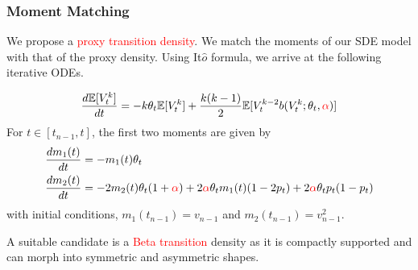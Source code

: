 \documentclass[aspectratio=169]{beamer}\usepackage[utf8]{inputenc}
\newcommand{\E}{\mathbb{E}}
\begin{document}
\begin{frame}\frametitle{Moment Matching}
We propose a \textcolor{red}{proxy transition density}. We match the moments of our SDE model with that of the proxy density. Using It$\hat{o}$ formula, we arrive at the following iterative ODEs.

\begin{equation}
\begin{split}
\frac{d \E[ V^k_t]}{dt} = - k \theta_t \E [ V^k_t] + \frac{k(k-1)}{2} \E [ V^{k-2}_t  b(V^k_t;\theta_t, \textcolor{red}{\alpha})]
\end{split}
\end{equation}
For $t\in [t_{n-1}, t]$, the first two moments are given by
\begin{equation}
\begin{split}
\frac{d m_1 (t)}{dt} &= - m_1(t)\theta_t \\
\frac{d m_2 (t)}{dt} &=  -2 m_2(t)\theta_t(1+\textcolor{red}{\alpha}) + 2\textcolor{red}{\alpha}\theta_t m_1(t)(1-2p_t) + 2 \textcolor{red}{\alpha}\theta_t p_t (1-p_t)\\
\end{split}
\end{equation}
with initial conditions, $m_1(t_{n-1})= v_{n-1}$ and $m_2(t_{n-1})= v_{n-1}^2$.

 A suitable candidate is a \textcolor{red}{Beta transition } density as it is compactly supported and can morph into symmetric and asymmetric shapes.

\end{frame}
\end{document}
